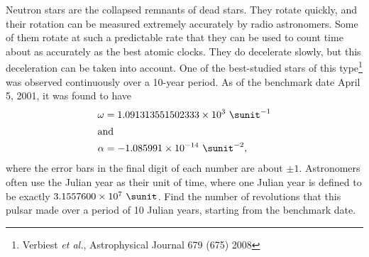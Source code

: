 Neutron stars are the collapsed remnants of dead stars.
They rotate quickly, and their rotation can be measured extremely
accurately by radio astronomers. Some of them rotate at such a predictable
rate that they can be used to count time about as accurately as the
best atomic clocks. They do decelerate slowly, but this
deceleration can be taken into account. One of the best-studied
stars of this type\footnote{Verbiest \emph{et al.}, Astrophysical Journal 679 (675) 2008}
was observed continuously over a 10-year period. As of
the benchmark date April 5, 2001, it was found to have
\begin{align*}
  \omega &= 1.091313551502333\times10^{3}\ \sunit^{-1} \\
\intertext{and}
  \alpha &= -1.085991\times10^{-14}\ \sunit^{-2},
\end{align*}
where the error bars in the final digit of each number are about $\pm 1$.
Astronomers often use the Julian year as their unit of time, where one
Julian year is defined to be exactly $3.1557600\times10^7\ \sunit$. Find the
number of revolutions that this pulsar made over a period of 10 Julian
years, starting from the benchmark date.\answercheck

